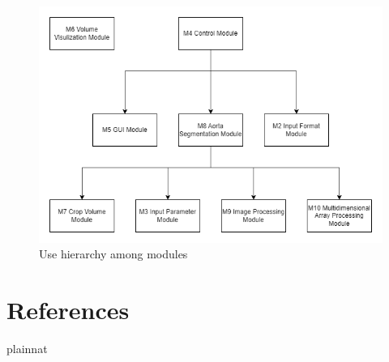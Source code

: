 \documentclass[12pt, titlepage]{article}
\begin{document}
\begin{figure}[H]
\centering
\includegraphics[width=\textwidth]{UsesHierarchy.png}
\caption{Use hierarchy among modules}
\label{FigUH}
\end{figure}

\newpage
\section{References}

 {plainnat}

\end{document}

